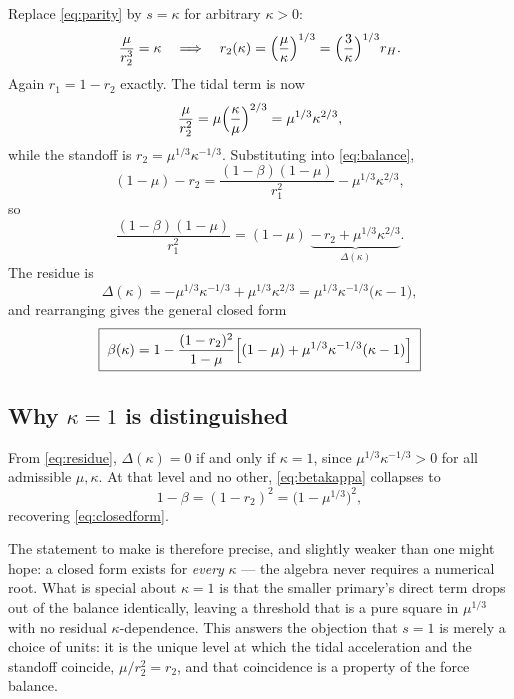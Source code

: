 \documentclass[11pt,a4paper]{article}
\begin{document}
Replace \eqref{eq:parity} by $s=\kappa$ for arbitrary $\kappa>0$:
\begin{equation}
  \frac{\mu}{r_2^3}=\kappa
  \quad\Longrightarrow\quad
  r_2(\kappa) = \Bigl(\frac{\mu}{\kappa}\Bigr)^{1/3}
              = \Bigl(\frac{3}{\kappa}\Bigr)^{1/3} r_H .
  \label{eq:r2kappa}
\end{equation}
Again $r_1=1-r_2$ exactly. The tidal term is now
\begin{equation}
  \frac{\mu}{r_2^2} = \mu\Bigl(\frac{\kappa}{\mu}\Bigr)^{2/3}
                    = \mu^{1/3}\kappa^{2/3},
\end{equation}
while the standoff is $r_2=\mu^{1/3}\kappa^{-1/3}$. Substituting into
\eqref{eq:balance},
\begin{equation}
  (1-\mu)-r_2 = \frac{(1-\beta)(1-\mu)}{r_1^2} - \mu^{1/3}\kappa^{2/3},
\end{equation}
so
\begin{equation}
  \frac{(1-\beta)(1-\mu)}{r_1^2}
  = (1-\mu) \;\underbrace{-\,r_2 + \mu^{1/3}\kappa^{2/3}}_{\textstyle\Delta(\kappa)} .
\end{equation}
The residue is
\begin{equation}
  \Delta(\kappa) = -\mu^{1/3}\kappa^{-1/3} + \mu^{1/3}\kappa^{2/3}
                 = \mu^{1/3}\kappa^{-1/3}\bigl(\kappa-1\bigr),
  \label{eq:residue}
\end{equation}
and rearranging gives the general closed form
\begin{equation}
  \boxed{\;\beta(\kappa) = 1 - \frac{(1-r_2)^2}{1-\mu}
    \Bigl[(1-\mu) + \mu^{1/3}\kappa^{-1/3}(\kappa-1)\Bigr]\;}
  \label{eq:betakappa}
\end{equation}

\subsection{Why \texorpdfstring{$\kappa=1$}{kappa=1} is distinguished}

From \eqref{eq:residue}, $\Delta(\kappa)=0$ if and only if $\kappa=1$, since
$\mu^{1/3}\kappa^{-1/3}>0$ for all admissible $\mu,\kappa$. At that level and
no other, \eqref{eq:betakappa} collapses to
\begin{equation}
  1-\beta = (1-r_2)^2 = \bigl(1-\mu^{1/3}\bigr)^2,
\end{equation}
recovering \eqref{eq:closedform}.

The statement to make is therefore precise, and slightly weaker than one might
hope: a closed form exists for \emph{every} $\kappa$ --- the algebra never
requires a numerical root. What is special about $\kappa=1$ is that the smaller
primary's direct term drops out of the balance identically, leaving a threshold
that is a pure square in $\mu^{1/3}$ with no residual $\kappa$-dependence. This
answers the objection that $s=1$ is merely a choice of units: it is the unique
level at which the tidal acceleration and the standoff coincide,
$\mu/r_2^2=r_2$, and that coincidence is a property of the force balance.
\end{document}
